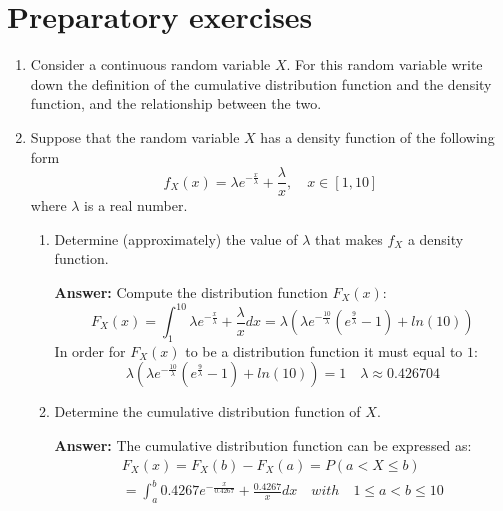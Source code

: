 \documentclass[letterpaper,12pt]{article}
\begin{document}
\section*{Preparatory exercises}
\begin{enumerate}
  \item Consider a continuous random variable $X$. For this random variable write down the definition of the cumulative distribution function and the density function, and the relationship between the two.
  \item Suppose that the random variable $X$ has a density function of the following form
  \begin{equation}
  f_{X}(x) = \lambda e^{-\frac{x}{\lambda}} + \frac{\lambda}{x}, \quad x \in [1,10]
  \end{equation}
  where $\lambda$ is a real number.
  
  \begin{enumerate}
    \item Determine (approximately) the value of $\lambda$ that makes $f_{X}$ a density function.
    \begin{tcolorbox}
    \textbf{Answer:}
    Compute the distribution function $F_{X}(x)$:
    \begin{equation*}
    F_{X}(x) = \int_{1}^{10} \lambda e^{-\frac{x}{\lambda}} + \frac{\lambda}{x} dx = \lambda (\lambda e^{-\frac{10}{\lambda}} (e^{\frac{9}{\lambda}}-1) + ln(10))
    \end{equation*}
    In order for $F_{X}(x)$ to be a distribution function it must equal to $1$:
    \begin{equation*}
    \lambda (\lambda e^{-\frac{10}{\lambda}} (e^{\frac{9}{\lambda}}-1) + ln(10)) = 1 \quad \lambda \approx 0.426704
    \end{equation*}
    \end{tcolorbox}
    
    \item Determine the cumulative distribution function of $X$.
    \begin{tcolorbox}
    \textbf{Answer:}
    The cumulative distribution function can be expressed as:
    \begin{gather*}
        F_{X}(x) = F_{X}(b) - F_{X}(a) = P(a < X \leq b)\\
        = \int_{a}^{b} 0.4267 e^{-\frac{x}{0.4267}} + \frac{0.4267}{x} dx \quad with \quad 1 \leq a < b \leq 10
    \end{gather*}
    \end{tcolorbox}
    

\end{enumerate}
\end{enumerate}
\end{document}
